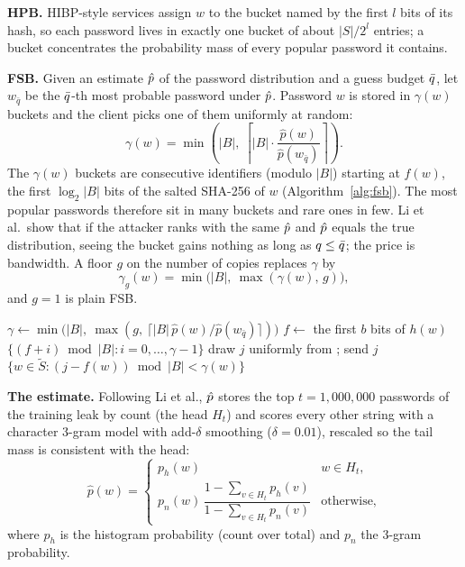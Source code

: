\textbf{HPB.} HIBP-style services assign $w$ to the bucket named by the first $l$ bits of its hash, so each password lives in exactly one bucket of about $|S|/2^l$ entries; a bucket concentrates the probability mass of every popular password it contains.

\textbf{FSB.} Given an estimate $\hat p$ of the password distribution and a guess budget $\bar q$, let $w_{\bar q}$ be the $\bar q$-th most probable password under $\hat p$. Password $w$ is stored in $\gamma(w)$ buckets and the client picks one of them uniformly at random:
\begin{equation}\label{eq:gamma}
\gamma(w) = \min\left(|B|,\ \left\lceil |B| \cdot \frac{\hat p(w)}{\hat p(w_{\bar q})} \right\rceil\right).
\end{equation}
The $\gamma(w)$ buckets are consecutive identifiers (modulo $|B|$) starting at $f(w)$, the first $\log_2|B|$ bits of the salted SHA-256 of $w$ (Algorithm~\ref{alg:fsb}). The most popular passwords therefore sit in many buckets and rare ones in few. Li et al.\ show that if the attacker ranks with the same $\hat p$ and $\hat p$ equals the true distribution, seeing the bucket gains nothing as long as $q\le\bar q$; the price is bandwidth. A floor $g$ on the number of copies replaces $\gamma$ by
\begin{equation}\label{eq:floor}
\gamma_g(w)=\min\bigl(|B|,\ \max(\gamma(w),\,g)\bigr),
\end{equation}
and $g=1$ is plain FSB.

\begin{algorithm}[t]
\caption{FSB with a floor $g$ ($g=1$: plain FSB); $b=\log_2|B|$.}
\label{alg:fsb}
\begin{algorithmic}[1]
  \State $\gamma \gets \min\bigl(|B|,\ \max(g,\ \lceil |B|\,\hat p(w)/\hat p(w_{\bar q})\rceil)\bigr)$
  \State $f \gets$ the first $b$ bits of $h(w)$
  \State \Return $\{(f+i) \bmod |B| : i=0,\dots,\gamma-1\}$
\EndFunction
{}
  \State draw $j$ uniformly from ; send $j$
\EndFunction
{}
  \State \Return $\{w\in\tilde S : (j-f(w)) \bmod |B| < \gamma(w)\}$
\EndFunction
\end{algorithmic}
\end{algorithm}

\textbf{The estimate.} Following Li et al., $\hat p$ stores the top $t=1{,}000{,}000$ passwords of the training leak by count (the head $H_t$) and scores every other string with a character 3-gram model with add-$\delta$ smoothing ($\delta=0.01$), rescaled so the tail mass is consistent with the head:
\begin{equation}\label{eq:est}
\hat p(w)=\begin{cases} p_h(w) & w\in H_t,\\[2pt] p_n(w)\,\dfrac{1-\sum_{v\in H_t}p_h(v)}{1-\sum_{v\in H_t}p_n(v)} & \text{otherwise,}\end{cases}
\end{equation}
where $p_h$ is the histogram probability (count over total) and $p_n$ the 3-gram probability.


